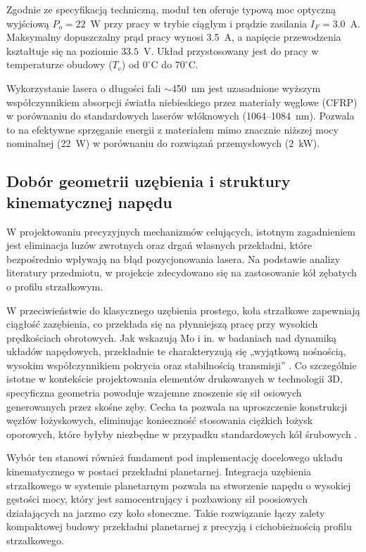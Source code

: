 \documentclass[a4paper,twoside,12pt]{book}
\begin{document}
Zgodnie ze specyfikacją techniczną, moduł ten oferuje typową moc optyczną wyjściową $P_o = 22$~W przy pracy w trybie ciągłym i prądzie zasilania $I_F = 3.0$~A. Maksymalny dopuszczalny prąd pracy wynosi 3.5~A, a napięcie przewodzenia kształtuje się na poziomie $33.5$~V. Układ przystosowany jest do pracy w temperaturze obudowy ($T_c$) od $0^{\circ}$C do $70^{\circ}$C.

Wykorzystanie lasera o długości fali $\sim$450~nm jest uzasadnione wyższym współczynnikiem absorpcji światła niebieskiego przez materiały węglowe (CFRP) w porównaniu do standardowych laserów włóknowych (1064--1084~nm). Pozwala to na efektywne sprzęganie energii z materiałem mimo znacznie niższej mocy nominalnej (22~W) w porównaniu do rozwiązań przemysłowych (2~kW).

\subsection{Dobór geometrii uzębienia i struktury kinematycznej napędu}

W projektowaniu precyzyjnych mechanizmów celujących, istotnym zagadnieniem jest eliminacja luzów zwrotnych oraz drgań własnych przekładni, które bezpośrednio wpływają na błąd pozycjonowania lasera. Na podstawie analizy literatury przedmiotu, w projekcie zdecydowano się na zastosowanie kół zębatych o profilu strzałkowym.

W przeciwieństwie do klasycznego uzębienia prostego, koła strzałkowe zapewniają ciągłość zazębienia, co przekłada się na płynniejszą pracę przy wysokich prędkościach obrotowych. Jak wskazują Mo i in. w badaniach nad dynamiką układów napędowych, przekładnie te charakteryzują się „wyjątkową nośnością, wysokim współczynnikiem pokrycia oraz stabilnością transmisji” \cite{bib:Mo2025}. Co szczególnie istotne w kontekście projektowania elementów drukowanych w technologii 3D, specyficzna geometria powoduje wzajemne znoszenie się sił osiowych generowanych przez skośne zęby. Cecha ta pozwala na uproszczenie konstrukcji węzłów łożyskowych, eliminując konieczność stosowania ciężkich łożysk oporowych, które byłyby niezbędne w przypadku standardowych kół śrubowych \cite{bib:Mo2025}.

Wybór ten stanowi również fundament pod implementację docelowego układu kinematycznego w postaci przekładni planetarnej. Integracja uzębienia strzałkowego w systemie planetarnym pozwala na stworzenie napędu o wysokiej gęstości mocy, który jest samocentrujący i pozbawiony sił poosiowych działających na jarzmo czy koło słoneczne. Takie rozwiązanie łączy zalety kompaktowej budowy przekładni planetarnej z precyzją i cichobieżnością profilu strzałkowego.
\end{document}
